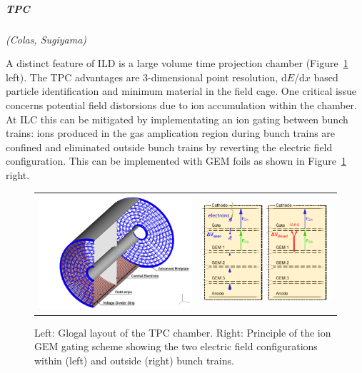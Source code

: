 \vspace{1cm}
\subparagraph*{\bf TPC}
\textit{(Colas, Sugiyama)}

A distinct feature of ILD is a large volume time projection chamber (Figure~\ref{fig:det:TPC} left). The TPC advantages are 3-dimensional point resolution, d$E$/d$x$ based particle identification and minimum material in the field cage. One critical issue concerns potential field distorsions due to ion accumulation within the chamber. At ILC this can be mitigated by implementating an ion gating between bunch trains: ions produced in the gas amplication region during bunch trains are confined and eliminated outside bunch trains by reverting the electric field configuration. This can be implemented with GEM foils as shown in Figure~\ref{fig:det:TPC} right.

\begin{figure}[t!]
\begin{tabular}{cc}
\includegraphics[width=0.6\hsize,viewport={0 -10 600 500},clip]{Detector/fig/TPC.png} &
\includegraphics[width=0.4\hsize]{Detector/fig/gating.png}
\end{tabular}
\caption[TPC layout]{Left: Glogal layout of the TPC chamber. Right: Principle of the ion GEM gating scheme showing the two electric field configurations within (left) and outside (right) bunch trains.}
\label{fig:det:TPC}
\end{figure}

